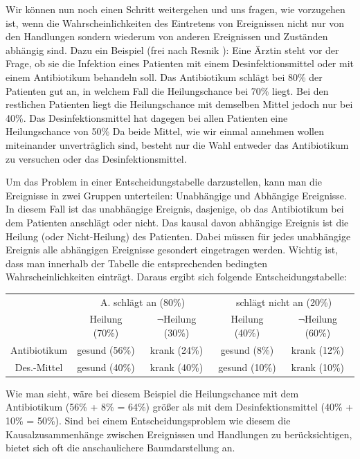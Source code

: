 Wir können nun noch einen Schritt weitergehen und uns fragen, wie vorzugehen
ist, wenn die Wahrscheinlichkeiten des Eintretens von Ereignissen nicht nur von den
Handlungen sondern wiederum von anderen Ereignissen und Zuständen abhängig sind.
Dazu ein Beispiel (frei nach Resnik \cite[S. 114]{resnik:1987}): Eine Ärztin
steht vor der Frage, ob sie die Infektion eines Patienten mit einem
Desinfektionsmittel oder mit einem Antibiotikum behandeln soll. Das
Antibiotikum schlägt bei 80\% der Patienten gut an, in welchem Fall die
Heilungschance bei 70\% liegt. Bei den restlichen Patienten liegt die
Heilungschance mit demselben Mittel jedoch nur bei 40\%. Das
Desinfektionsmittel hat dagegen bei allen Patienten eine Heilungschance von 50\%
Da beide Mittel, wie wir einmal annehmen wollen miteinander unverträglich sind,
besteht nur die Wahl entweder das Antibiotikum zu versuchen oder das
Desinfektionsmittel.

Um das Problem in einer Entscheidungstabelle darzustellen, kann man die
Ereignisse in zwei Gruppen unterteilen: Unabhängige und Abhängige Ereignisse. In
diesem Fall ist das unabhängige Ereignis, dasjenige, ob das Antibiotikum bei dem
Patienten anschlägt oder nicht. Das kausal davon abhängige Ereignis ist die
Heilung (oder Nicht-Heilung) des Patienten. Dabei müssen für jedes unabhängige
Ereignis alle abhängigen Ereignisse gesondert eingetragen werden. Wichtig ist,
dass man innerhalb der Tabelle die entsprechenden bedingten Wahrscheinlichkeiten
einträgt. Daraus ergibt sich folgende Entscheidungstabelle:
\begin{center}
\begin{footnotesize}
\begin{tabular}{c|c|c|c|c|}
\multicolumn{1}{c}{} & \multicolumn{2}{c}{A. schlägt an (80\%)} 
                     & \multicolumn{2}{c}{schlägt nicht an (20\%)} \\
\multicolumn{1}{c}{} & \multicolumn{1}{c}{Heilung (70\%)}
                     & \multicolumn{1}{c}{$\neg$Heilung (30\%)}
                     & \multicolumn{1}{c}{Heilung (40\%)}
                     & \multicolumn{1}{c}{$\neg$Heilung (60\%)}
                     \\ \cline{2-5}                       
Antibiotikum  & gesund (56\%) & krank (24\%) & gesund (8\%) & krank (12\%) 
\\ \cline{2-5} 
Des.-Mittel   & gesund (40\%) & krank (40\%) & gesund (10\%) & krank (10\%) 
\\ \cline{2-5}
\end{tabular}
\end{footnotesize}
\end{center}
Wie man sieht, wäre bei diesem Beispiel die Heilungschance mit dem
Antibiotikum (56\% + 8\% = 64\%) größer als mit dem Desinfektionsmittel (40\%
+ 10\% = 50\%). Sind bei einem Entscheidungsproblem wie diesem die
Kausalzusammenhänge zwischen Ereignissen und Handlungen zu berücksichtigen, bietet sich oft die anschaulichere
Baumdarstellung an.


